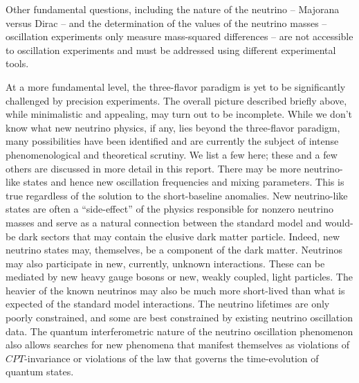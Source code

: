 Other fundamental questions, including the nature of the neutrino -- Majorana versus Dirac -- and the determination of the values of the neutrino masses -- oscillation experiments only measure mass-squared differences -- are not accessible to oscillation experiments and must be addressed using different experimental tools.  

At a more fundamental level, the three-flavor paradigm is yet to be significantly challenged by precision experiments. The overall picture described briefly above, while minimalistic and appealing, may turn out to be incomplete. While we don't know what new neutrino physics, if any, lies beyond the three-flavor paradigm, many possibilities have been identified and are currently the subject of intense phenomenological and theoretical scrutiny. We list a few here; these and a few others are discussed in more detail in this report. There may be more neutrino-like states and hence new oscillation frequencies and mixing parameters. This is true regardless of the solution to the short-baseline anomalies. New neutrino-like states are often a ``side-effect'' of the physics responsible for nonzero neutrino masses and serve as a natural connection between the standard model and would-be dark sectors that may contain the elusive dark matter particle. Indeed, new neutrino states may, themselves, be a component of the dark matter. Neutrinos may also participate in new, currently, unknown interactions. These can be mediated by new heavy gauge bosons or new, weakly coupled, light particles. The heavier of the known neutrinos may also be much more short-lived than what is expected of the standard model interactions. The neutrino lifetimes are only poorly constrained, and some are best constrained by existing neutrino oscillation data. The quantum interferometric nature of the neutrino oscillation phenomenon also allows searches for new phenomena that manifest themselves as violations of $CPT$-invariance or violations of the law that governs the time-evolution of quantum states. 

